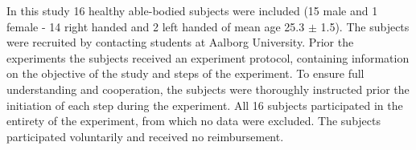 In this study 16 healthy able-bodied subjects were included (15 male and 1 female - 14 right handed and 2 left handed of mean age 25.3 $\pm$ 1.5). The subjects were recruited by contacting students at Aalborg University. Prior the experiments the subjects received an experiment protocol, containing information on the objective of the study and steps of the experiment. To ensure full understanding and cooperation, the subjects were thoroughly instructed prior the initiation of each step during the experiment. All 16 subjects participated in the entirety of the experiment, from which no data were excluded. The subjects participated voluntarily and received no reimbursement.
